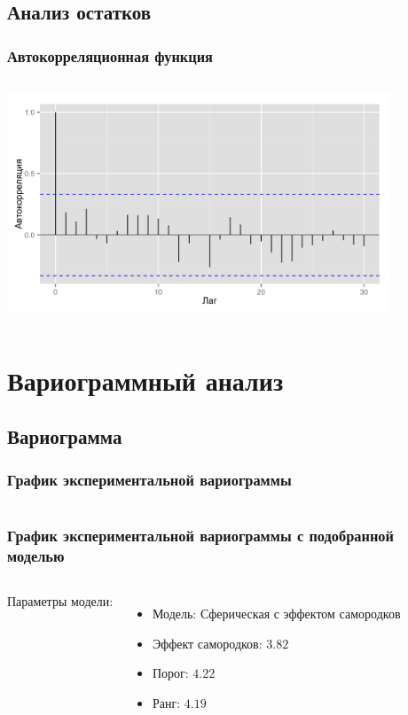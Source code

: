 \documentclass[10pt,pdf,aspectratio=169]{beamer}
\begin{document}
\subsection{Анализ остатков}

\begin{frame}
  \frametitle{Автокорреляционная функция}   %
   \begin{columns}[c]
   \column{4.5in}
  \includegraphics[width=4.5in]{../../figures/residual/acf.png}
  \end{columns}
\end{frame}

\section{Вариограммный анализ}

\subsection{Вариограмма}

\begin{frame}
  \frametitle{График экспериментальной вариограммы}   %
   \begin{columns}[c]
   \column{4.5in}
  \end{columns}
\end{frame}

\begin{frame}
  \frametitle{График экспериментальной вариограммы с подобранной моделью}   %
  \begin{columns}[c]
  \column{2in}  %
  Параметры модели:
  \begin{itemize}
  \item Модель: Сферическая с эффектом самородков
  \item Эффект самородков: $3.82$
  \item Порог: $4.22$
  \item Ранг: $4.19$
  \end{itemize}
  \column{3in}
  \end{columns}
\end{frame}
\end{document}
